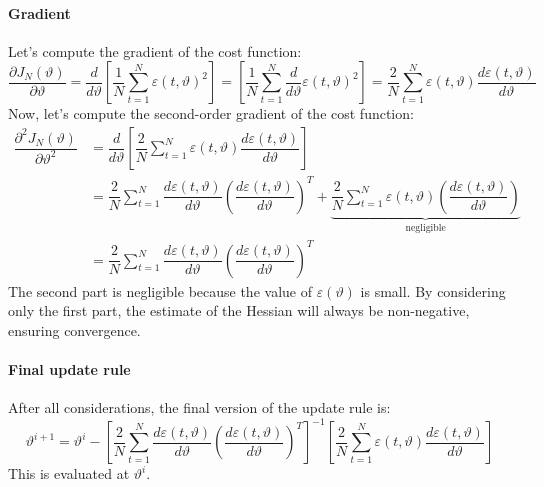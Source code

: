 \paragraph*{Gradient}       
Let's compute the gradient of the cost function:
\[\dfrac{\partial J_N(\vartheta)}{\partial\vartheta} =\dfrac{d}{d\vartheta}\left[ \dfrac{1}{N}\sum_{t=1}^{N} \varepsilon(t,\vartheta)^2 \right]=\left[ \dfrac{1}{N}\sum_{t=1}^{N} \dfrac{d}{d\vartheta}\varepsilon(t,\vartheta)^2 \right]=\dfrac{2}{N}\sum_{t=1}^{N}\varepsilon(t,\vartheta)\dfrac{d\varepsilon(t,\vartheta)}{d\vartheta}\]
Now, let's compute the second-order gradient of the cost function:
\begin{align*}
    \dfrac{\partial^2 J_N(\vartheta)}{\partial\vartheta^2}  &=\dfrac{d}{d\vartheta}\left[ \dfrac{2}{N}\sum_{t=1}^{N}\varepsilon(t,\vartheta)\dfrac{d\varepsilon(t,\vartheta)}{d\vartheta} \right] \\
                                                            &=\dfrac{2}{N}\sum_{t=1}^{N}\dfrac{d\varepsilon(t,\vartheta)}{d\vartheta}\left(\dfrac{d\varepsilon(t,\vartheta)}{d\vartheta}\right)^T + \underbrace{\dfrac{2}{N}\sum_{t=1}^{N}\varepsilon(t,\vartheta)\left(\dfrac{d\varepsilon(t,\vartheta)}{d\vartheta}\right)}_{\text{negligible}}  \\
                                                            &=\dfrac{2}{N}\sum_{t=1}^{N}\dfrac{d\varepsilon(t,\vartheta)}{d\vartheta}\left(\dfrac{d\varepsilon(t,\vartheta)}{d\vartheta}\right)^T
\end{align*}
The second part is negligible because the value of $\varepsilon(\vartheta)$ is small. 
By considering only the first part, the estimate of the Hessian will always be non-negative, ensuring convergence.

\paragraph*{Final update rule}
After all considerations, the final version of the update rule is:
\[\vartheta^{i+1}=\vartheta^i-\left[ \dfrac{2}{N}\sum_{t=1}^{N}\dfrac{d\varepsilon(t,\vartheta)}{d\vartheta}\left(\dfrac{d\varepsilon(t,\vartheta)}{d\vartheta}\right)^T \right]^{-1}\left[\dfrac{2}{N}\sum_{t=1}^{N}\varepsilon(t,\vartheta)\dfrac{d\varepsilon(t,\vartheta)}{d\vartheta}\right]\]
This is evaluated at $\vartheta^i$.

